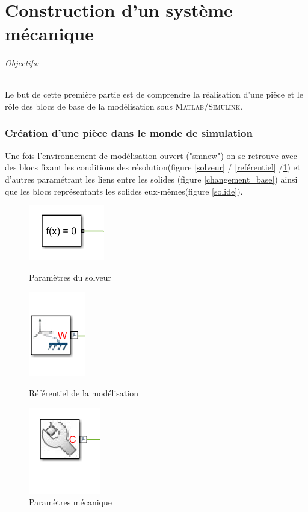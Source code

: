 \documentclass[12pt,a4paper]{article}
\begin{document}
\part{Construction d'un système mécanique} 
\paragraph*{Objectifs:}
Le but de cette première partie est de comprendre la réalisation d'une pièce et le rôle des blocs de base de la modélisation sous \textsc{Matlab/Simulink}.
\section{Création d'une pièce dans le monde de simulation}

Une fois l'environnement de modélisation ouvert ("smnew") on se retrouve avec des blocs fixant les conditions des résolution(figure \ref{solveur} / \ref{reférentiel} /\ref{param_mecanique}) et d'autres paramétrant les liens entre les solides (figure \ref{changement_base}) ainsi que les blocs représentants les solides eux-mêmes(figure \ref{solide}).

\begin{figure}[h!]
\centering
\begin{minipage}[c]{0.3\linewidth}
\centering
\includegraphics[scale=0.7]{solveur.png}
\caption{Paramètres du solveur}
\label{solveur}
\end{minipage} \hfill
\begin{minipage}[c]{0.3\linewidth}
\centering
\includegraphics[scale=0.5]{repere.png}
\caption{Référentiel de la modélisation}
\label{reférentiel}
\end{minipage} \hfill
\begin{minipage}[c]{0.3\linewidth}
\centering
\includegraphics[scale=0.5]{param.png}
\caption{Paramètres mécanique}
\label{param_mecanique}
\end{minipage} 
\end{figure}
\end{document}
